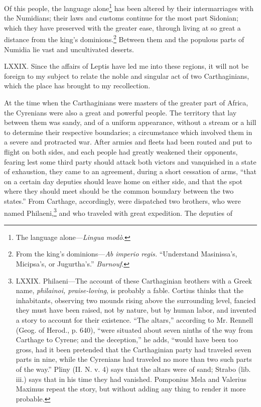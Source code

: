 Of this people, the language alone\footnote{The language alone—\emph{Lingua modò}.} has been altered by their
intermarriages with the Numidians; their laws and customs continue for
the most part Sidonian; which they have preserved with the greater
ease, through living at so great a distance from the king's
dominions.\footnote{From the king's dominions—\emph{Ab imperio regis.} ``Understand
Masinissa's, Micipsa's, or Jugurtha's.'' \emph{Burnouf}.} Between them and the populous parts of Numidia lie
vast and uncultivated deserts.

LXXIX. Since the affairs of Leptis have led me into these regions, it
will not be foreign to my subject to relate the noble and singular act
of two Carthaginians, which the place has brought to my recollection.

At the time when the Carthaginians were masters of the greater part of
Africa, the Cyrenians were also a great and powerful people. The
territory that lay between them was sandy, and of a uniform
appearance, without a stream or a hill to determine their respective
boundaries; a circumstance which involved them in a severe and
protracted war. After armies and fleets had been routed and put to
flight on both sides, and each people had greatly weakened their
opponents, fearing lest some third party should attack both victors
and vanquished in a state of exhaustion, they came to an agreement,
during a short cessation of arms, ``that on a certain day deputies
should leave home on either side, and that the spot where they should
meet should be the common boundary between the two states.'' From
Carthage, accordingly, were dispatched two brothers, who were named
Philaeni,\footnote{LXXIX. Philaeni—The account of these Carthaginian brothers
with a Greek name, \emph{philainoi, praise-loving}, is probably a fable.
Cortius thinks that the inhabitants, observing two mounds rising above
the surrounding level, fancied they must have been raised, not by
nature, but by human labor, and invented a story to account for their
existence. ``The altars,'' according to Mr. Rennell (Geog. of Herod., p.
640), ``were situated about seven ninths of the way from Carthage to
Cyrene; and the deception,'' he adds, ``would have been too gross, had
it been pretended that the Carthaginian party had traveled seven parts
in nine, while the Cyrenians had traveled no more than two such parts
of the way.'' Pliny (II. N. v. 4) says that the altars were of sand;
Strabo (lib. iii.) says that in his time they had vanished. Pomponius
Mela and Valerius Maximus repeat the story, but without adding any
thing to render it more probable.} and who traveled with great expedition. The deputies of
